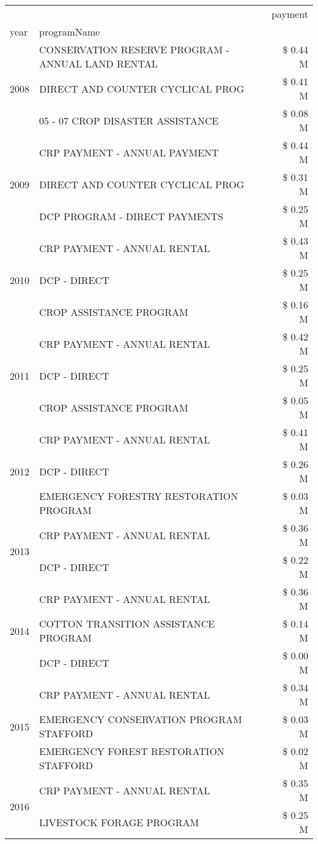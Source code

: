\begin{tabular}{llr}
\toprule
 &  & payment \\
year & programName &  \\
\midrule
\multirow[t]{3}{*}{2008} & CONSERVATION RESERVE PROGRAM - ANNUAL LAND RENTAL & \$ 0.44 M \\
 & DIRECT AND COUNTER CYCLICAL PROG & \$ 0.41 M \\
 & 05 - 07 CROP DISASTER ASSISTANCE & \$ 0.08 M \\
\cline{1-3}
\multirow[t]{3}{*}{2009} & CRP PAYMENT - ANNUAL PAYMENT & \$ 0.44 M \\
 & DIRECT AND COUNTER CYCLICAL PROG & \$ 0.31 M \\
 & DCP PROGRAM - DIRECT PAYMENTS & \$ 0.25 M \\
\cline{1-3}
\multirow[t]{3}{*}{2010} & CRP PAYMENT - ANNUAL RENTAL & \$ 0.43 M \\
 & DCP - DIRECT & \$ 0.25 M \\
 & CROP ASSISTANCE PROGRAM & \$ 0.16 M \\
\cline{1-3}
\multirow[t]{3}{*}{2011} & CRP PAYMENT - ANNUAL RENTAL & \$ 0.42 M \\
 & DCP - DIRECT & \$ 0.25 M \\
 & CROP ASSISTANCE PROGRAM & \$ 0.05 M \\
\cline{1-3}
\multirow[t]{3}{*}{2012} & CRP PAYMENT - ANNUAL RENTAL & \$ 0.41 M \\
 & DCP - DIRECT & \$ 0.26 M \\
 & EMERGENCY FORESTRY RESTORATION PROGRAM & \$ 0.03 M \\
\cline{1-3}
\multirow[t]{2}{*}{2013} & CRP PAYMENT - ANNUAL RENTAL & \$ 0.36 M \\
 & DCP - DIRECT & \$ 0.22 M \\
\cline{1-3}
\multirow[t]{3}{*}{2014} & CRP PAYMENT - ANNUAL RENTAL & \$ 0.36 M \\
 & COTTON TRANSITION ASSISTANCE PROGRAM & \$ 0.14 M \\
 & DCP - DIRECT & \$ 0.00 M \\
\cline{1-3}
\multirow[t]{3}{*}{2015} & CRP PAYMENT - ANNUAL RENTAL & \$ 0.34 M \\
 & EMERGENCY CONSERVATION PROGRAM STAFFORD & \$ 0.03 M \\
 & EMERGENCY FOREST RESTORATION STAFFORD & \$ 0.02 M \\
\cline{1-3}
\multirow[t]{3}{*}{2016} & CRP PAYMENT - ANNUAL RENTAL & \$ 0.35 M \\
 & LIVESTOCK FORAGE PROGRAM & \$ 0.25 M \\

\end{tabular}
